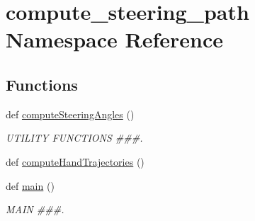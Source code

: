 \hypertarget{namespacecompute__steering__path}{}\section{compute\+\_\+steering\+\_\+path Namespace Reference}
\label{namespacecompute__steering__path}
\subsection*{Functions}
\begin{DoxyCompactItemize}
\item 
def \mbox{\hyperlink{namespacecompute__steering__path_ad2026608ff223639011c485a28b76311}{compute\+Steering\+Angles}} ()
\begin{DoxyCompactList}\small\item\em U\+T\+I\+L\+I\+TY F\+U\+N\+C\+T\+I\+O\+NS \#\#\#. \end{DoxyCompactList}\item 
def \mbox{\hyperlink{namespacecompute__steering__path_a7b5761807cb6896d26a326000e13efdc}{compute\+Hand\+Trajectories}} ()
\item 
def \mbox{\hyperlink{namespacecompute__steering__path_a595f095c82464b1e9ee202094f3988f6}{main}} ()
\begin{DoxyCompactList}\small\item\em M\+A\+IN \#\#\#. \end{DoxyCompactList}\end{DoxyCompactItemize}
